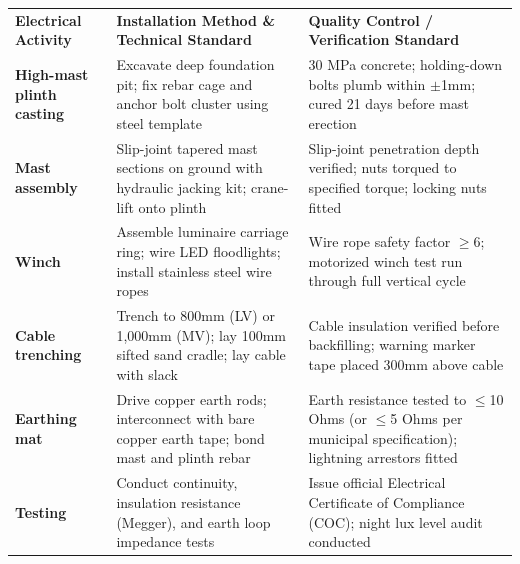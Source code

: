 \documentclass[a4paper,11pt]{article}
\begin{document}
{\fontsize{7.7pt}{9.8pt}\selectfont
\renewcommand{\arraystretch}{1.23}
\noindent
\begin{tabularx}{\textwidth}{@{}p{3.3cm} p{6.6cm} X@{}}
\rowcolor{mhnavy}
{\color{white}\bfseries Electrical Activity} & {\color{white}\bfseries Installation Method \& Technical Standard} & {\color{white}\bfseries Quality Control / Verification Standard} \\
\rowcolor{mhbluelight}
\bfseries High-mast plinth casting & Excavate deep foundation pit; fix rebar cage and anchor bolt cluster using steel template & 30 MPa concrete; holding-down bolts plumb within $\pm$1mm; cured 21 days before mast erection \\
\bfseries Mast assembly & Slip-joint tapered mast sections on ground with hydraulic jacking kit; crane-lift onto plinth & Slip-joint penetration depth verified; nuts torqued to specified torque; locking nuts fitted \\
\rowcolor{mhbluelight}
\bfseries Winch & Assemble luminaire carriage ring; wire LED floodlights; install stainless steel wire ropes & Wire rope safety factor $\ge$6; motorized winch test run through full vertical cycle \\
\bfseries Cable trenching & Trench to 800mm (LV) or 1,000mm (MV); lay 100mm sifted sand cradle; lay cable with slack & Cable insulation verified before backfilling; warning marker tape placed 300mm above cable \\
\rowcolor{mhbluelight}
\bfseries Earthing mat & Drive copper earth rods; interconnect with bare copper earth tape; bond mast and plinth rebar & Earth resistance tested to $\le$10 Ohms (or $\le$5 Ohms per municipal specification); lightning arrestors fitted \\
\bfseries Testing & Conduct continuity, insulation resistance (Megger), and earth loop impedance tests & Issue official Electrical Certificate of Compliance (COC); night lux level audit conducted \\
\end{tabularx}
\renewcommand{\arraystretch}{1}
}

\vfill
\end{document}
